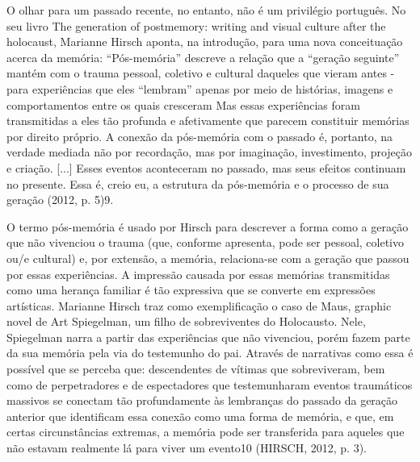 \documentclass[../DISSERTACAO_MAIN.tex]{subfiles}
\begin{document}
O olhar para um passado recente, no entanto, não é um privilégio português. No seu livro The generation of postmemory: writing and visual culture after the holocaust, Marianne Hirsch aponta, na introdução, para uma nova conceituação acerca da memória:
“Pós-memória” descreve a relação que a “geração seguinte” mantém com o trauma pessoal, coletivo e cultural daqueles que vieram antes - para experiências que eles “lembram” apenas por meio de histórias, imagens e comportamentos entre os quais cresceram Mas essas experiências foram transmitidas a eles tão profunda e afetivamente que parecem constituir memórias por direito próprio. A conexão da pós-memória com o passado é, portanto, na verdade mediada não por recordação, mas por imaginação, investimento, projeção e criação. [...] Esses eventos aconteceram no passado, mas seus efeitos continuam no presente. Essa é, creio eu, a estrutura da pós-memória e o processo de sua geração (2012, p. 5)9.

O termo pós-memória é usado por Hirsch para descrever a forma como a geração que não vivenciou o trauma (que, conforme apresenta, pode ser pessoal, coletivo ou/e cultural) e, por extensão, a memória, relaciona-se com a geração que passou por essas experiências. A impressão causada por essas memórias transmitidas como uma herança familiar é tão expressiva que se converte em expressões artísticas. Marianne Hirsch traz como exemplificação o caso de Maus, graphic novel de Art Spiegelman, um filho de sobreviventes do Holocausto. Nele, Spiegelman narra a partir das experiências que não vivenciou, porém fazem parte da sua memória pela via do testemunho do pai. Através de narrativas como essa é possível que se perceba que:
descendentes de vítimas que sobreviveram, bem como de perpetradores e de espectadores que testemunharam eventos traumáticos massivos se conectam tão profundamente às lembranças do passado da geração anterior que identificam essa conexão como uma forma de memória, e que, em certas circunstâncias extremas, a memória pode ser transferida para aqueles que não estavam realmente lá para viver um evento10 (HIRSCH, 2012, p. 3).
\end{document}

